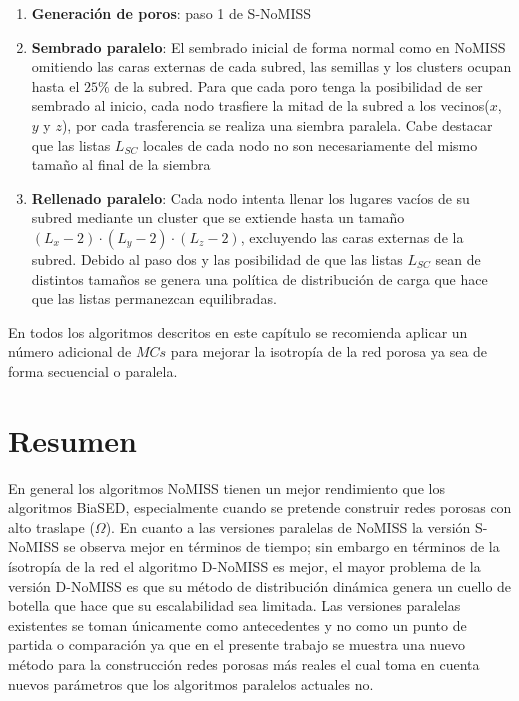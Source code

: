 \begin{enumerate}
\item \textbf{Generación de poros}: paso 1 de S-NoMISS

\item \textbf{Sembrado paralelo}: El sembrado inicial de forma normal como en NoMISS omitiendo las caras externas de cada subred, las semillas y los clusters ocupan hasta el $25\%$ de la subred. Para que cada poro tenga la posibilidad de ser sembrado al inicio, cada nodo trasfiere la mitad de la subred a los vecinos($x$, $y$ y $z$), por cada trasferencia se realiza una siembra paralela. Cabe destacar que las listas $L_{SC}$ locales de cada nodo no son necesariamente del mismo tamaño al final de la siembra

\item \textbf{Rellenado paralelo}: Cada nodo intenta llenar los lugares vacíos de su subred mediante un cluster que se extiende hasta un tamaño $(L_x -2) \cdot (L_y - 2) \cdot (L_z -2)$, excluyendo las caras externas de la subred. Debido al paso dos y las posibilidad de que las listas $L_{SC}$ sean de distintos tamaños se genera una política de distribución de carga que hace que las listas permanezcan equilibradas.
\end{enumerate}

En todos los algoritmos descritos en este capítulo se recomienda aplicar un número adicional de $MCs$ para mejorar la isotropía de la red porosa ya sea de forma secuencial o paralela.\\


\section{Resumen}
\label{sec:rwconclutions}
En general los algoritmos NoMISS tienen un mejor rendimiento que los algoritmos BiaSED, especialmente cuando se pretende construir redes porosas con alto traslape ($\Omega$). En cuanto a las versiones paralelas de NoMISS la versión S-NoMISS se observa mejor en términos de tiempo; sin embargo en términos de la ísotropía de la red el algoritmo D-NoMISS es mejor, el mayor problema de la versión D-NoMISS es que su método de distribución dinámica genera un cuello de botella que hace que su escalabilidad sea limitada. Las versiones paralelas existentes se toman únicamente como antecedentes y no como un punto de partida o comparación ya que en el presente trabajo se muestra una nuevo método para la construcción redes porosas  más reales el cual toma en cuenta nuevos parámetros que los algoritmos paralelos actuales no.\\

